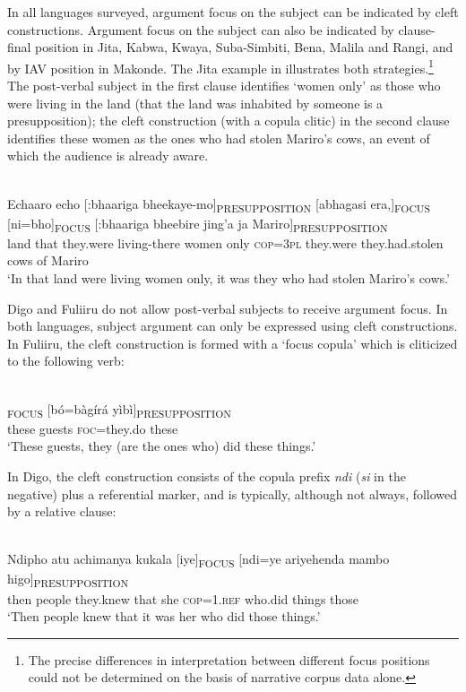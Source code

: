 \documentclass[output=paper]{langsci/langscibook}
\begin{document}
In all languages surveyed, argument focus on the subject can be indicated by cleft constructions. Argument focus on the subject can also be indicated by clause-final position in Jita, Kabwa, Kwaya, Suba-Simbiti, Bena, Malila and Rangi, and by IAV position in Makonde. The Jita example in  illustrates both strategies.\footnote{The precise differences in interpretation between different focus positions could not be determined on the basis of narrative corpus data alone.} The post-verbal subject in the first clause identifies ‘women only’ as those who were living in the land (that the land was inhabited by someone is a presupposition); the cleft construction (with a copula clitic) in the second clause identifies these women as the ones who had stolen Mariro’s cows, an event of which the audience is already aware.

\ea\label{ex:20.nicolle}
\\
\gll Echaaro echo [:bhaariga bheekaye-mo]\textsubscript{PRESUPPOSITION} [abhagasi era,]\textsubscript{FOCUS} [ni=bho]\textsubscript{FOCUS} [:bhaariga bheebire jing’a ja Mariro]\textsubscript{PRESUPPOSITION}\\
land that {\db}they.were living-there {\db}women only {\db}\textsc{cop=3pl} {\db}they.were they.had.stolen cows of Mariro \\
\glt ‘In that land were living women only, it was they who had stolen Mariro’s cows.’
\z

Digo and Fuliiru do not allow post-verbal subjects to receive argument focus. In both languages, subject argument can only be expressed using cleft constructions. In Fuliiru, the cleft construction is formed with a ‘focus copula’ which is cliticized to the following verb:

\ea\label{ex:21.nicolle}
\\
\textsubscript{FOCUS} [bó=bàgírá yìbì]\textsubscript{PRESUPPOSITION}\\
{\db}these guests {\db}\textsc{foc}=they.do these \\
\glt ‘These guests, they (are the ones who) did these things.’
\z

In Digo, the cleft construction consists of the copula prefix \textit{ndi} (\textit{si} in the negative) plus a referential marker, and is typically, although not always, followed by a relative clause:

\ea\label{ex:22.nicolle}
\\
\gll Ndipho atu achimanya kukala [iye]\textsubscript{FOCUS} [ndi=ye ariyehenda mambo higo]\textsubscript{PRESUPPOSITION}\\
then people they.knew that {\db}she {\db}\textsc{cop=1.ref} who\textsc{.}did things those \\
\glt ‘Then people knew that it was her who did those things.’
\z
\end{document}
